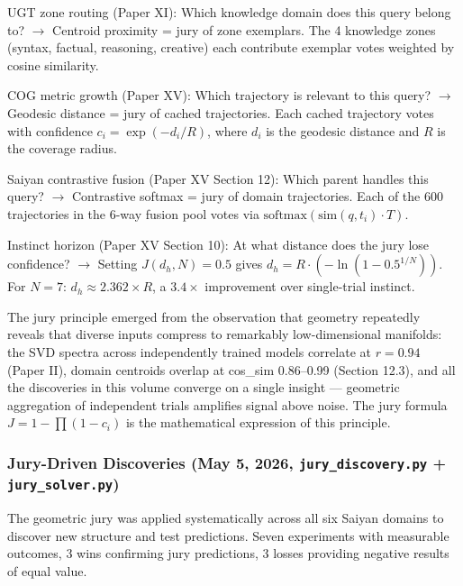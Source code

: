 \documentclass[11pt]{article}
\begin{document}
UGT zone routing (Paper XI): Which knowledge domain does this query belong to? $\to$ Centroid proximity = jury of zone exemplars. The 4 knowledge zones (syntax, factual, reasoning, creative) each contribute exemplar votes weighted by cosine similarity.

COG metric growth (Paper XV): Which trajectory is relevant to this query? $\to$ Geodesic distance = jury of cached trajectories. Each cached trajectory votes with confidence $c_i = \exp(-d_i/R)$, where $d_i$ is the geodesic distance and $R$ is the coverage radius.

Saiyan contrastive fusion (Paper XV Section 12): Which parent handles this query? $\to$ Contrastive softmax = jury of domain trajectories. Each of the 600 trajectories in the 6-way fusion pool votes via $\text{softmax}(\text{sim}(q, t_i) \cdot T)$.

Instinct horizon (Paper XV Section 10): At what distance does the jury lose confidence? $\to$ Setting $J(d_h, N) = 0.5$ gives $d_h = R \cdot (-\ln(1 - 0.5^{1/N}))$. For $N=7$: $d_h \approx 2.362 \times R$, a $3.4\times$ improvement over single-trial instinct.

The jury principle emerged from the observation that geometry repeatedly reveals that diverse inputs compress to remarkably low-dimensional manifolds: the SVD spectra across independently trained models correlate at $r = 0.94$ (Paper II), domain centroids overlap at cos\_sim 0.86--0.99 (Section 12.3), and all the discoveries in this volume converge on a single insight --- geometric aggregation of independent trials amplifies signal above noise. The jury formula $J = 1 - \prod(1 - c_i)$ is the mathematical expression of this principle.

\subsubsection*{Jury-Driven Discoveries (May 5, 2026, \texttt{jury\_discovery.py} + \texttt{jury\_solver.py})}

The geometric jury was applied systematically across all six Saiyan domains to discover new structure and test predictions. Seven experiments with measurable outcomes, 3 wins confirming jury predictions, 3 losses providing negative results of equal value.
\end{document}
